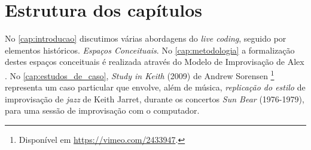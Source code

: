 \section*{Estrutura dos capítulos}

No \autoref{cap:introducao} discutimos  várias abordagens do \emph{live coding}, seguido por elementos históricos. \emph{Espaços Conceituais}.  No \autoref{cap:metodologia} a formalização destes espaços conceituais é realizada através  do Modelo de Improvisação de Alex . No \autoref{cap:estudos_de_caso}, \emph{Study in Keith} (2009) de Andrew Sorensen \footnote{Disponível em \url{https://vimeo.com/2433947}.} representa um caso particular que envolve, além de música, \emph{replicação do estilo} de improvisação de \emph{jazz} de Keith Jarret, durante os concertos \emph{Sun Bear} (1976-1979), para uma sessão de improvisação com o computador.

